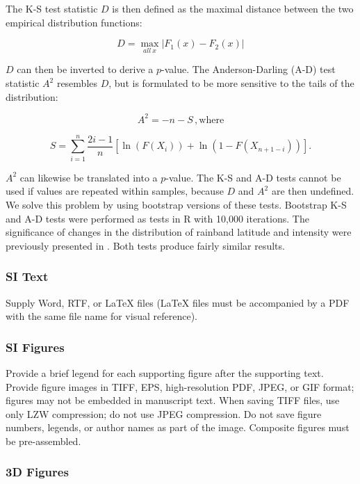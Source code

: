 \documentclass[9pt,twocolumn,twoside,lineno]{pnas-new}
\begin{document}
 The K-S test statistic $D$ is then defined as the maximal distance between the two empirical distribution functions:

\begin{equation}
	D=\max_{all\ x} |F_{1}(x)-F_{2}(x)|
\end{equation}

$D$ can then be inverted to derive a $p$-value. The Anderson-Darling (A-D) test statistic $A^2$ resembles $D$, but is formulated to be more sensitive to the tails of the distribution:

\begin{equation}
	A^2 = -n-S \,,
	\mathrm{where}
\end{equation}

\begin{equation}
	S=\sum_{i=1}^n \frac{2i-1}{n}\left[\ln(F(X_i)) + \ln\left(1-F(X_{n+1-i})\right)\right].
\end{equation}

	$A^2$ can likewise be translated into a $p$-value. The K-S and A-D tests cannot be used if values are repeated within samples, because $D$ and $A^2$ are then undefined. We solve this problem by using bootstrap versions of these tests. Bootstrap K-S and A-D tests were performed as tests in R with 10,000 iterations. The significance of changes in the distribution of rainband latitude and intensity were previously presented in \citet{Day2016}. Both tests produce fairly similar results.

\subsubsection*{SI Text}

Supply Word, RTF, or LaTeX files (LaTeX files must be accompanied by a PDF with the same file name for visual reference).

\subsubsection*{SI Figures}

Provide a brief legend for each supporting figure after the supporting text. Provide figure images in TIFF, EPS, high-resolution PDF, JPEG, or GIF format; figures may not be embedded in manuscript text. When saving TIFF files, use only LZW compression; do not use JPEG compression. Do not save figure numbers, legends, or author names as part of the image. Composite figures must be pre-assembled.

\subsubsection*{3D Figures}
\end{document}
